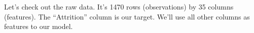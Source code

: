 \documentclass[]{book}
\newenvironment{Shaded}{\begin{snugshade}}{\end{snugshade}}
\newcommand{\CommentTok}[1]{\textcolor[rgb]{0.56,0.35,0.01}{\textit{#1}}}
\newcommand{\DataTypeTok}[1]{\textcolor[rgb]{0.13,0.29,0.53}{#1}}
\newcommand{\DecValTok}[1]{\textcolor[rgb]{0.00,0.00,0.81}{#1}}
\newcommand{\KeywordTok}[1]{\textcolor[rgb]{0.13,0.29,0.53}{\textbf{#1}}}
\newcommand{\NormalTok}[1]{#1}
\newcommand{\OperatorTok}[1]{\textcolor[rgb]{0.81,0.36,0.00}{\textbf{#1}}}
\newcommand{\StringTok}[1]{\textcolor[rgb]{0.31,0.60,0.02}{#1}}
\begin{document}
Let's check out the raw data. It's 1470 rows (observations) by 35 columns (features). The ``Attrition'' column is our target. We'll use all other columns as features to our model.

\begin{Shaded}
\end{Shaded}

\begin{table}[t]


\end{table}
\end{document}
